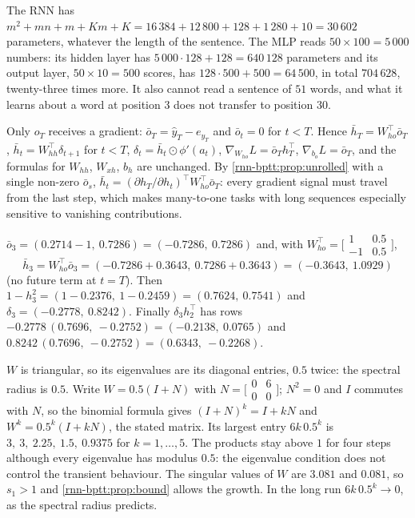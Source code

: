 The RNN has $m^2 + mn + m + Km + K = 16\,384 + 12\,800 + 128 + 1\,280 + 10 = 30\,602$ parameters, whatever the length of the
sentence. The MLP reads $50\times100 = 5\,000$ numbers: its hidden layer has $5\,000\cdot128 + 128 = 640\,128$ parameters and
its output layer, $50\times10 = 500$ scores, has $128\cdot500 + 500 = 64\,500$, in total $704\,628$, twenty-three times more. It
also cannot read a sentence of $51$ words, and what it learns about a word at position $3$ does
not transfer to position $30$.

Only $o_T$ receives a gradient: $\bar o_T = \hat y_T - e_{y_T}$ and $\bar o_t = 0$ for $t<T$. Hence $\bar h_T = W_{ho}^\top\bar o_T$, $\bar h_t = W_{hh}^\top\delta_{t+1}$ for $t<T$,
$\delta_t = \bar h_t\odot\phi'(a_t)$, $\nabla_{W_{ho}}L = \bar o_Th_T^\top$, $\nabla_{b_o}L = \bar o_T$, and the formulas for $W_{hh}$, $W_{xh}$, $b_h$ are unchanged. By
\cref{rnn-bptt:prop:unrolled} with a single non-zero $\bar o_s$, $\bar h_t = (\partial h_T/\partial h_t)^\top W_{ho}^\top\bar o_T$: every gradient
signal must travel from the last step, which makes many-to-one tasks with long sequences
especially sensitive to vanishing contributions.

$\bar o_3 = (0.2714 - 1,\ 0.7286) = (-0.7286,\ 0.7286)$ and, with $W_{ho}^\top = \bigl[\begin{smallmatrix}1 & 0.5\\ -1 & 0.5\end{smallmatrix}\bigr]$,
\[
  \bar h_3 = W_{ho}^\top\bar o_3 = (-0.7286 + 0.3643,\ 0.7286 + 0.3643) = (-0.3643,\ 1.0929)
\]
(no future term at $t = T$). Then $1 - h_3^2 = (1 - 0.2376,\ 1 - 0.2459) = (0.7624,\ 0.7541)$ and $\delta_3 = (-0.2778,\ 0.8242)$. Finally
$\delta_3h_2^\top$ has rows $-0.2778\,(0.7696,\ -0.2752) = (-0.2138,\ 0.0765)$ and $0.8242\,(0.7696,\ -0.2752) = (0.6343,\ -0.2268)$.

$W$ is triangular, so its eigenvalues are its diagonal entries, $0.5$ twice: the spectral radius is $0.5$. Write
$W = 0.5(I + N)$ with $N = \bigl[\begin{smallmatrix}0 & 6\\ 0 & 0\end{smallmatrix}\bigr]$; $N^2 = 0$ and $I$ commutes with $N$, so the binomial formula gives $(I + N)^k = I + kN$ and
$W^k = 0.5^k(I + kN)$, the stated matrix. Its largest entry $6k\,0.5^k$ is $3,\ 3,\ 2.25,\ 1.5,\ 0.9375$ for $k = 1,\dots,5$. The products stay
above $1$ for four steps although every eigenvalue has modulus $0.5$: the eigenvalue condition
does not control the transient behaviour. The singular values of $W$ are $3.081$ and $0.081$, so $s_1 > 1$ and
\cref{rnn-bptt:prop:bound} allows the growth. In the long run $6k\,0.5^k\to0$, as the spectral radius predicts.

